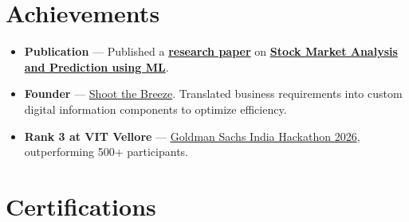 \documentclass[a4paper,10pt]{article}
\newcommand{\ulink}[2]{\href{#1}{#2}}
\begin{document}
\section{Achievements}
\vspace{2pt}

\begin{itemize}[nosep, leftmargin=1.5em, itemsep=2pt, topsep=2pt]
  \item {\color[HTML]{0A0A0A}\fontsize{11}{14}\selectfont \textbf{Publication} --- Published a \ulink{https://www.elruha.org/_files/ugd/614b1f_6b95e1b697bf452b9907ba46e0151c05.pdf\#page=774}{\textbf{research paper}} on \ulink{https://github.com/su-jin1425/Set-Project}{\textbf{Stock Market Analysis and Prediction using ML}}.}
  \item {\color[HTML]{0A0A0A}\fontsize{11}{14}\selectfont \textbf{Founder} --- \ulink{https://shoot-the-breeze.vercel.app}{Shoot the Breeze}. Translated business requirements into custom digital information components to optimize efficiency.}
  \item {\color[HTML]{0A0A0A}\fontsize{11}{14}\selectfont \textbf{Rank 3 at VIT Vellore} --- \ulink{https://www.hackerrank.com/contests/goldman-sachs-india-hackathon-2026-cs/leaderboard}{Goldman Sachs India Hackathon 2026}, outperforming 500+ participants.}
\end{itemize}

\section{Certifications}
\vspace{2pt}
\end{document}
